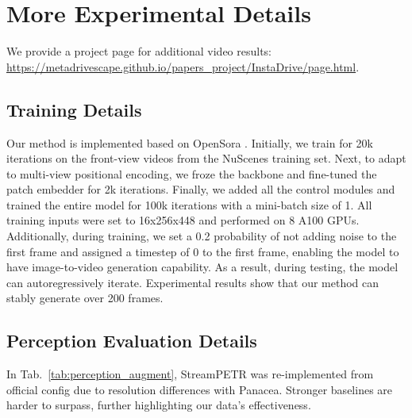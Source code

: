 


\section{More Experimental Details}  
\label{app: exp}


We provide a project page for additional video results: \url{https://metadrivescape.github.io/papers_project/InstaDrive/page.html}.



\subsection{Training Details}
Our method is implemented based on OpenSora \cite{opensora}. 
Initially, we train for 20k iterations on the front-view videos from the NuScenes training set. Next, to adapt to multi-view positional encoding, we froze the backbone and fine-tuned the patch embedder for 2k iterations. Finally, we added all the control modules and trained the entire model for 100k iterations with a mini-batch size of 1. All training inputs were set to 16x256x448 and performed on 8 A100 GPUs. Additionally, during training, we set a 0.2 probability of not adding noise to the first frame and assigned a timestep of 0 to the first frame, enabling the model to have image-to-video generation capability. As a result, during testing, the model can autoregressively iterate. Experimental results show that our method can stably generate over 200 frames.%

\subsection{Perception Evaluation Details}
In Tab.~\ref{tab:perception_augment}, StreamPETR was re-implemented from official config due to resolution differences with Panacea. Stronger baselines are harder to surpass, further highlighting our data’s effectiveness.




